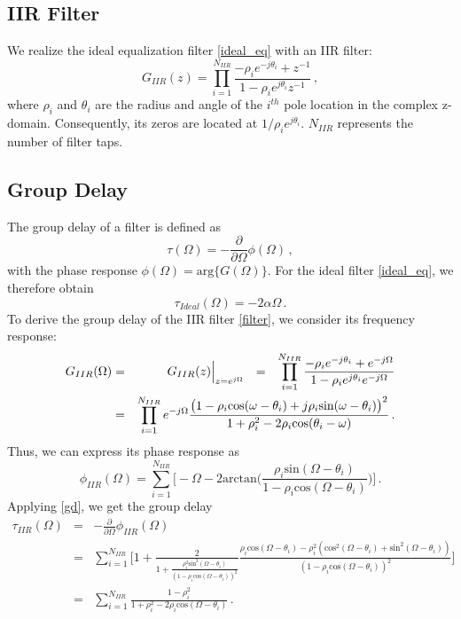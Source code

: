 \documentclass[paper=a4, fontsize=11pt]{scrartcl} %
\numberwithin{equation}{section} %
\numberwithin{figure}{section} %
\numberwithin{table}{section} %
\begin{document}
\subsection{IIR Filter}

We realize the ideal equalization filter \eqref{ideal_eq} with an IIR filter:
\begin{equation} 
G_{IIR}(z)=\prod_{i=1}^{N_{IIR}}\frac{-\rho_{i}e^{-j\theta_i}+z^{-1}}{1-\rho_{i}e^{j\theta_i}z^{-1}}\label{filter}\, ,
\end{equation}
where $\rho_i$ and $\theta_i$ are the radius and angle of the $i^{th}$ pole location in the complex z-domain. Consequently, its zeros are located at $1/\rho_i e^{j\theta_i}$. $N_{IIR}$ represents the number of filter taps.

\subsection{Group Delay}

The group delay of a filter is defined as
\begin{equation} 
\tau(\Omega)=-\frac{\partial}{\partial\Omega}\phi(\Omega)\label{gd}\, ,
\end{equation}
with the phase response $\phi(\Omega)=\text{arg}\{G(\Omega)\}$. For the ideal filter \eqref{ideal_eq}, we therefore obtain
\begin{equation} 
\tau_{Ideal}(\Omega)=-2\alpha\Omega\label{ideal_gd}\, .
\end{equation}
To derive the group delay of the IIR filter \eqref{filter}, we consider its frequency response:
\begin{eqnarray} 
G_{IIR}(\Omega)&=&G_{IIR}(z)\Big|_{z=e^{j\Omega}}\hspace{0.25cm}=\hspace{0.25cm}\prod_{i=1}^{N_{IIR}}\frac{-\rho_{i}e^{-j\theta_i}+e^{-j\Omega}}{1-\rho_{i}e^{j\theta_i}e^{-j\Omega}}\nonumber\\
&=&\prod_{i=1}^{N_{IIR}}e^{-j\Omega}\frac{\big(1-\rho_i \text{cos}(\omega-\theta_i)+j\rho_i \text{sin}(\omega-\theta_i)\big)^2}{1+\rho_i^2-2\rho_i\text{cos}(\theta_i-\omega)}\label{freq_resp_iir} \, .
\end{eqnarray}
Thus, we can express its phase response as
\begin{equation} 
\phi_{IIR}(\Omega)=\sum_{i=1}^{N_{IIR}}\Bigg[-\Omega-2\text{arctan}\Big(\frac{\rho_{i}\text{sin}(\Omega-\theta_i)}{1-\rho_{i}\text{cos}(\Omega-\theta_i)}\Big)\Bigg]\label{phase_resp_iir}\, .
\end{equation}
Applying \eqref{gd}, we get the group delay
\begin{eqnarray} 
\tau_{IIR}(\Omega)&=&-\frac{\partial}{\partial\Omega}\phi_{IIR}(\Omega)\nonumber\\
&=&\sum_{i=1}^{N_{IIR}}\Bigg[1+\frac{2}{1+\frac{\rho_{i}^2\text{sin}^2(\Omega-\theta_i)}{(1-\rho_{i}\text{cos}(\Omega-\theta_i))^2}}\frac{\rho_{i}\text{cos}(\Omega-\theta_i)-\rho_i^2(\text{cos}^2(\Omega-\theta_i)+\text{sin}^2(\Omega-\theta_i))}{(1-\rho_{i}\text{cos}(\Omega-\theta_i))^2}\Bigg]\nonumber\\
&=&\sum_{i=1}^{N_{IIR}}\frac{1-\rho_{i}^2}{1+\rho_{i}^2-2\rho_i\text{cos}(\Omega-\theta_i)}\label{gd_delay_iir} \, .
\end{eqnarray}
\end{document}
